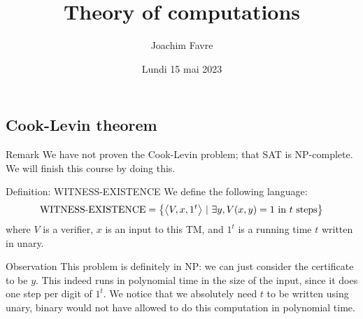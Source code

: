 \documentclass[a4paper]{article}
\title{Theory of computations}
\author{Joachim Favre}
\date{Lundi 15 mai 2023}
\begin{document}
\maketitle


\subsection{Cook-Levin theorem}
\begin{parag}{Remark}
    We have not proven the Cook-Levin problem; that SAT is NP-complete. We will finish this course by doing this.
\end{parag}

\begin{parag}{Definition: WITNESS-EXISTENCE}
    We define the following language: 
    \[\text{WITNESS-EXISTENCE} = \left\{\left\langle V, x, 1^t \right\rangle \suchthat \exists y, V\left(x, y\right) = 1 \text{ in $t$ steps}\right\}\]
    where $V$ is a verifier, $x$ is an input to this TM, and $1^t$ is a running time $t$ written in unary.

    \begin{subparag}{Observation}
        This problem is definitely in NP: we can just consider the certificate to be $y$. This indeed runs in polynomial time in the size of the input, since it does one step per digit of $1^t$. We notice that we absolutely need $t$ to be written using unary, binary would not have allowed to do this computation in polynomial time.
    \end{subparag}
\end{parag}
 
\end{document}
